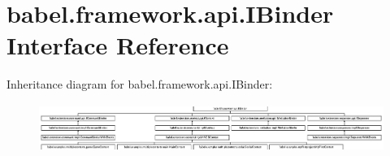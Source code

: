 \hypertarget{interfacebabel_1_1framework_1_1api_1_1_i_binder}{\section{babel.\-framework.\-api.\-I\-Binder Interface Reference}
\label{interfacebabel_1_1framework_1_1api_1_1_i_binder}
}
Inheritance diagram for babel.\-framework.\-api.\-I\-Binder\-:\begin{figure}[H]
\begin{center}
\leavevmode
\includegraphics[height=1.577465cm]{interfacebabel_1_1framework_1_1api_1_1_i_binder}
\end{center}
\end{figure}
